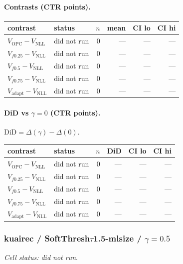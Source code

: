 \documentclass[10pt,a4paper]{article}
\begin{document}
\paragraph{Contrasts (CTR points).}
{\centering\small\begin{tabular}{llrrrr}
\toprule contrast & status & $n$ & mean & CI lo & CI hi \\
\midrule
$V_{\mathrm{OPC}}-V_{\mathrm{NLL}}$ & did not run & 0 & --- & --- & --- \\
$V_{f0.25}-V_{\mathrm{NLL}}$ & did not run & 0 & --- & --- & --- \\
$V_{f0.5}-V_{\mathrm{NLL}}$ & did not run & 0 & --- & --- & --- \\
$V_{f0.75}-V_{\mathrm{NLL}}$ & did not run & 0 & --- & --- & --- \\
$V_{\mathrm{adapt}}-V_{\mathrm{NLL}}$ & did not run & 0 & --- & --- & --- \\
\bottomrule\end{tabular}\par}
\paragraph{DiD vs $\gamma=0$ (CTR points).} $\mathrm{DiD}=\Delta(\gamma)-\Delta(0)$.
{\centering\small\begin{tabular}{llrrrr}
\toprule contrast & status & $n$ & DiD & CI lo & CI hi \\
\midrule
$V_{\mathrm{OPC}}-V_{\mathrm{NLL}}$ & did not run & 0 & --- & --- & --- \\
$V_{f0.25}-V_{\mathrm{NLL}}$ & did not run & 0 & --- & --- & --- \\
$V_{f0.5}-V_{\mathrm{NLL}}$ & did not run & 0 & --- & --- & --- \\
$V_{f0.75}-V_{\mathrm{NLL}}$ & did not run & 0 & --- & --- & --- \\
$V_{\mathrm{adapt}}-V_{\mathrm{NLL}}$ & did not run & 0 & --- & --- & --- \\
\bottomrule\end{tabular}\par}
\bigskip
\subsubsection{kuairec / SoftThresh$\tau$1.5-mlsize / $\gamma=0.5$}
\emph{Cell status: did not run}.
\end{document}
